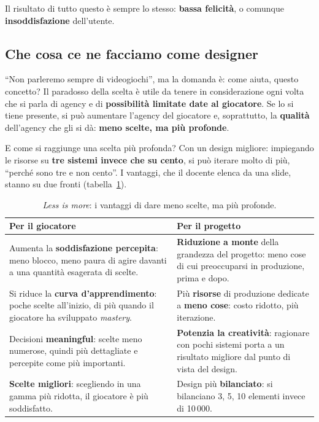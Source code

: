Il risultato di tutto questo è sempre lo stesso: \textbf{bassa felicità}, o
comunque \textbf{insoddisfazione} dell'utente.

\subsection{Che cosa ce ne facciamo come designer}

``Non parleremo sempre di videogiochi'', ma la domanda è: come aiuta, questo
concetto? Il paradosso della scelta è utile da tenere in considerazione ogni
volta che si parla di agency e di \textbf{possibilità limitate date al
giocatore}. Se lo si tiene presente, si può aumentare l'agency del giocatore
e, soprattutto, la \textbf{qualità} dell'agency che gli si dà: \textbf{meno
scelte, ma più profonde}.

E come si raggiunge una scelta più profonda? Con un design migliore:
impiegando le risorse su \textbf{tre sistemi invece che su cento}, si può
iterare molto di più, ``perché sono tre e non cento''. I vantaggi, che il
docente elenca da una slide, stanno su due fronti (tabella~\ref{gd9:tab:less-is-more}).

\begin{table}[htbp]
  \centering
  \caption{\emph{Less is more}: i vantaggi di dare meno scelte, ma più
  profonde.}
  \label{gd9:tab:less-is-more}
  \small
  \begin{tabular}{@{}p{}p{}@{}}
    \toprule
    \textbf{Per il giocatore} & \textbf{Per il progetto} \\
    \midrule
    Aumenta la \textbf{soddisfazione percepita}: meno blocco, meno paura di
    agire davanti a una quantità esagerata di scelte. &
    \textbf{Riduzione a monte} della grandezza del progetto: meno cose di
    cui preoccuparsi in produzione, prima e dopo. \\
    \addlinespace
    Si riduce la \textbf{curva d'apprendimento}: poche scelte all'inizio,
    di più quando il giocatore ha sviluppato \emph{mastery}. &
    Più \textbf{risorse} di produzione dedicate a \textbf{meno cose}: costo
    ridotto, più iterazione. \\
    \addlinespace
    Decisioni \textbf{meaningful}: scelte meno numerose, quindi più
    dettagliate e percepite come più importanti. &
    \textbf{Potenzia la creatività}: ragionare con pochi sistemi porta a un
    risultato migliore dal punto di vista del design. \\
    \addlinespace
    \textbf{Scelte migliori}: scegliendo in una gamma più ridotta, il
    giocatore è più soddisfatto. &
    Design più \textbf{bilanciato}: si bilanciano 3, 5, 10 elementi invece
    di 10\,000. \\
    \bottomrule
  \end{tabular}
\end{table}

